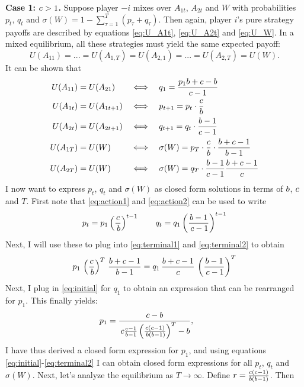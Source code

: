 \documentclass[../paper.tex]{subfiles}
\begin{document}
\textbf{Case 1: $c>1$.}
Suppose player $-i$ mixes over $A_{1t}$, $A_{2t}$ and $W$ with probabilities $p_{t}$, $q_{t}$ and $\sigma(W)=1-\sum_{\tau=1}^{T}(p_\tau+q_\tau)$. Then again, player $i$'s pure strategy payoffs are described by equations \ref{eq:U_A1t}, \ref{eq:U_A2t} and \ref{eq:U_W}.
In a mixed equilibrium, all these strategies must yield the same expected payoff:
\[
U(A_{11})=...=U(A_{1,T})=U(A_{2,1})=...=U(A_{2,T})=U(W).
\]
It can be shown that 
\begin{align}
U(A_{11}) &= U(A_{21}) 
&&\Longleftrightarrow \quad q_1 = \frac{p_1 \bparam +\cparam-\bparam}{\cparam-1}
\label{eq:initial} \\
%
U(A_{1t}) &= U(A_{1t+1}) 
&&\Longleftrightarrow \quad p_{t+1} = p_t\cdot\frac{c}{b}
\label{eq:action1} \\
%
U(A_{2t}) &= U(A_{2t+1}) 
&&\Longleftrightarrow \quad q_{t+1} = q_t\cdot\frac{b-1}{c-1}
\label{eq:action2} \\
%
U(A_{1T}) &= U(W) 
&&\Longleftrightarrow \quad \sigma(W) = p_T\cdot\frac{c}{b}\cdot\frac{b+c-1}{b-1}
\label{eq:terminal1} \\
%
U(A_{2T}) &= U(W) 
&&\Longleftrightarrow \quad \sigma(W) = q_T \cdot \frac{b-1}{c-1}\frac{b+c-1}{c}
\label{eq:terminal2}
\end{align}
I now want to express $p_t$, $q_t$ and $\sigma(W)$ as closed form solutions in terms of $b$, $c$ and $T$. First note that \ref{eq:action1} and \ref{eq:action2} can be used to write
\[
p_t = p_1 \left(\frac{c}{\,b}\right)^{t-1} \qquad 
q_t = q_1 \left(\frac{b-1}{\,c-1}\right)^{t-1}
\]
Next, I will use these to plug into \ref{eq:terminal1} and \ref{eq:terminal2} to obtain
\[
p_1 \, \left(\frac{c}{\,b}\right)^{T} \, \frac{b+c-1}{b-1} =  q_1 \, \frac{b+c-1}{c} \, \left(\frac{b-1}{\,c-1}\right)^{T}
\]
Next, I plug in \ref{eq:initial} for $q_1$ to obtain an expression that can be rearranged for $p_1$. This finally yields:
\begin{equation}
   p_1 = \frac{c-b}{\,c\frac{c-1}{b-1}\left(\frac{c(c-1)}{\,b(b-1)}\right)^{T}-b}, \qquad
   \label{eq:p_deriv}
\end{equation}
I have thus derived a closed form expression for $p_1$, and using equations \ref{eq:initial}-\ref{eq:terminal2} I can obtain closed form expressions for all $p_t$, $q_t$ and $\sigma(W)$. Next, let's analyze the equilibrium as $T\to\infty$. Define $r=\frac{c(c-1)}{b(b-1)}$. Then
\end{document}
